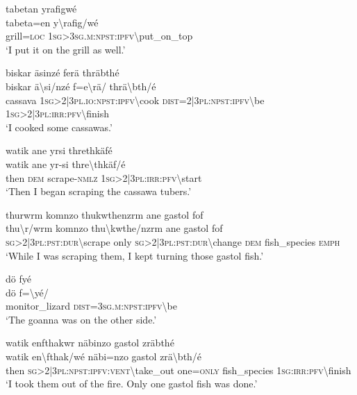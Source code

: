 \ea\label{ex:13:a1385}
tabetan yrafigwé\\
\gll tabeta=en	y{\textbackslash}rafig/wé\\
     grill=\textsc{loc}	1\textsc{sg}>3\textsc{sg}.\textsc{m}:\textsc{npst}:\textsc{ipfv}{\textbackslash}put\_on\_top\\
\glt `I put it on the grill as well.'
\z

\ea\label{ex:13:a1386}
biskar äsinzé ferä thräbthé\\
\gll biskar	ä{\textbackslash}si/nzé	f=e{\textbackslash}rä/	thrä{\textbackslash}bth/é\\
     cassava	1\textsc{sg}>2|3\textsc{pl}.\textsc{io}:\textsc{npst}:\textsc{ipfv}{\textbackslash}cook	\textsc{dist}=2|3\textsc{pl}:\textsc{npst}:\textsc{ipfv}{\textbackslash}be	1\textsc{sg}>2|3\textsc{pl}:\textsc{irr}:\textsc{pfv}{\textbackslash}finish\\
\glt `I cooked some cassawas.'
\z

\ea\label{ex:13:a1387}
watik ane yrsi threthkäfé\\
\gll watik	ane	yr-si	thre{\textbackslash}thkäf/é\\
     then	\textsc{dem}	scrape-\textsc{nmlz}	1\textsc{sg}>2|3\textsc{pl}:\textsc{irr}:\textsc{pfv}{\textbackslash}start\\
\glt `Then I began scraping the cassawa tubers.'
\z

\ea\label{ex:13:a1388}
thurwrm komnzo thukwthenzrm ane gastol fof\\
\gll thu{\textbackslash}r/wrm	komnzo	thu{\textbackslash}kwthe/nzrm	ane	gastol	fof\\
     \textsc{sg}>2|3\textsc{pl}:\textsc{pst}:\textsc{dur}{\textbackslash}scrape	only	\textsc{sg}>2|3\textsc{pl}:\textsc{pst}:\textsc{dur}{\textbackslash}change	\textsc{dem}	fish\_species	\textsc{emph}\\
\glt `While I was scraping them, I kept turning those gastol fish.'
\z

\ea\label{ex:13:a1391}
dö fyé\\
\gll dö	f={\textbackslash}yé/\\
     monitor\_lizard	\textsc{dist}=3\textsc{sg}.\textsc{m}:\textsc{npst}:\textsc{ipfv}{\textbackslash}be\\
\glt `The goanna was on the other side.'
\z

\ea\label{ex:13:a1392}
watik enfthakwr näbinzo gastol zräbthé\\
\gll watik	en{\textbackslash}fthak/wé	näbi=nzo	gastol	zrä{\textbackslash}bth/é\\
     then	\textsc{sg}>2|3\textsc{pl}:\textsc{npst}:\textsc{ipfv}:\textsc{vent}{\textbackslash}take\_out	one=\textsc{only}	fish\_species	1\textsc{sg}:\textsc{irr}:\textsc{pfv}{\textbackslash}finish\\
\glt `I took them out of the fire. Only one gastol fish was done.'
\z

